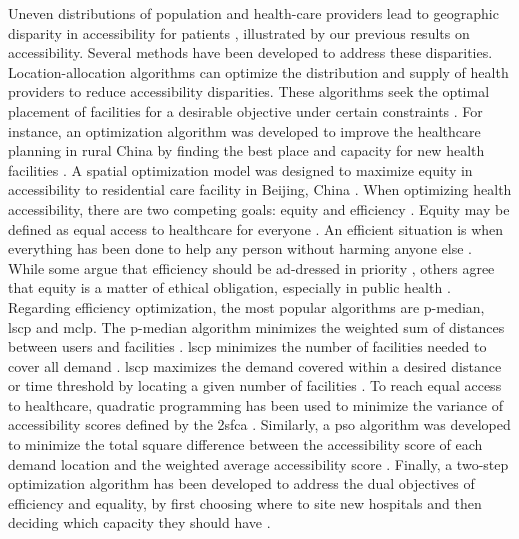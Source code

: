 Uneven distributions of population and health-care providers lead to geographic
disparity in accessibility for patients \cite{wang_why_2020}, illustrated by our
previous results on accessibility. Several methods have been developed to
address these disparities. Location-allocation algorithms
\cite{church_location_1999} can optimize the distribution and supply of health
providers to reduce accessibility disparities. These algorithms seek the optimal
placement of facilities for a desirable objective under certain constraints
\cite{wang_measurement_2012}. For instance, an optimization algorithm  was
developed to improve the healthcare planning in rural China by finding the best
place and capacity for new health facilities \cite{luo_integrating_2014}.
A spatial optimization model was designed to maximize equity in accessibility
to residential care facility in Beijing, China \cite{tao_spatial_2014}. When
optimizing health accessibility, there are two competing goals: equity and
efficiency \cite{krugman_opinion_2013,meyer_equity_2008}. Equity may be defined
as equal access to healthcare for everyone \cite{culyer_equity_1993}. An
efficient situation is when everything has been done to help any person without
harming anyone else \cite{hemenway_optimal_1982}. While some argue that
efficiency should be ad-dressed in priority \cite{hemenway_optimal_1982}, others
agree that equity is a matter of ethical obligation, especially in public health
\cite{fried_rights_1975, oliver_equity_2004}. Regarding efficiency optimization,
the most popular algorithms are p-median, \ac{lscp} and \ac{mclp}. The p-median
algorithm minimizes the weighted sum of distances between users and facilities
\cite{murad_using_2021}. \ac{lscp} minimizes the number of facilities needed to
cover all demand \cite{shavandi_fuzzy_2006}. \ac{lscp} maximizes the demand
covered within a desired distance or time threshold by locating a given number
of facilities \cite{casado_heuristical_2005}. To reach equal access to
healthcare, quadratic programming has been used to  minimize the variance of
accessibility scores defined by the \ac{2sfca} \cite{wang_planning_2013}.
Similarly, a \ac{pso} algorithm was developed to minimize the total square
difference between the accessibility score of each demand location and the
weighted average accessibility score \cite{tao_spatial_2014}. Finally, a
two-step optimization algorithm has been developed to address the dual
objectives of efficiency and equality, by first choosing where to site new
hospitals and then deciding which capacity they should have
\cite{luo_two-step_2017,li_two-step_2017}.


